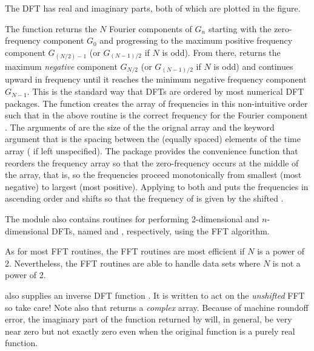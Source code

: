 \documentclass[letterpaper,10pt,english]{sphinxmanual}
\begin{document}
The DFT has real and imaginary parts, both of which are plotted in the figure.

The  function returns the \(N\) Fourier components of \(G_n\) starting with the zero-frequency component \(G_0\) and progressing to the maximum positive frequency component \(G_{(N/2)-1}\) (or \(G_{(N-1)/2}\) if \(N\) is odd).  From there,  returns the maximum \emph{negative} component \(G_{N/2}\)  (or \(G_{(N-1)/2}\) if \(N\) is odd) and continues upward in frequency until it reaches the minimum negative frequency component \(G_{N-1}\).  This is the standard way that DFTs are ordered by most numerical DFT packages.  The  function  creates the array of frequencies in this non-intuitive order such that  in the above routine is the correct frequency for the Fourier component .  The arguments of  are the size of the the orignal array  and the keyword argument  that is the spacing between the (equally spaced) elements of the time array ( if left unspecified).  The package  provides the convenience function  that reorders the frequency array so that the zero-frequency occurs at the middle of the array, that is, so the frequencies proceed monotonically from smallest (most negative) to largest (most positive).  Applying  to both  and  puts the frequencies  in ascending order and shifts  so that the frequency of  is given by the shifted .

The  module also contains routines for performing 2-dimensional and \(n\)-dimensional DFTs, named  and , respectively, using the FFT algorithm.

As for most FFT routines, the  FFT routines are most efficient if \(N\) is a power of 2.  Nevertheless, the FFT routines are able to handle data sets where \(N\) is not a power of 2.

 also supplies an inverse DFT function .  It is written to act on the \emph{unshifted} FFT so take care!  Note also that  returns a \emph{complex} array.  Because of machine roundoff error, the imaginary part of the function returned by  will, in general, be very near zero but not exactly zero even when the original function is a purely real function.

\end{document}
